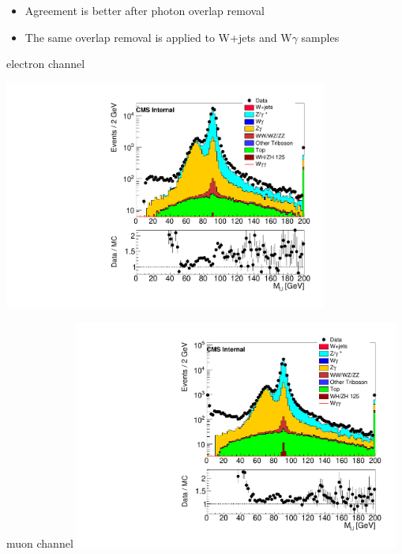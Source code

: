 \documentclass{beamer}
\begin{document}
 {

    \begin{itemize}
        \item Agreement is better after photon overlap removal
        \item The same overlap removal is applied to W+jets and W$\gamma$ samples
    \end{itemize}

    \bc
     
         electron channel
             
         \includegraphics[width=0.8\textwidth]{Plots/m_leplep_2el1ph_witholaprm.pdf}



         muon channel
        \includegraphics[width=0.8\textwidth]{Plots/m_leplep_2mu1ph_witholaprm.pdf}

    \ec
}
\end{document}
